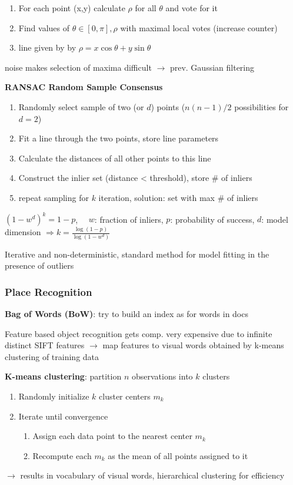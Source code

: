 \documentclass[fontsize=6pt]{scrartcl}
\begin{document}
\begin{multicols*}{4}
\begin{enumerate}
	\item For each point (x,y) calculate $\rho$ for all $\theta$  and vote for it 
	\item Find values of $\theta \in [0,\pi], \rho$ with maximal local votes (increase counter)
	\item line given by by $ \rho = x\cos \theta + y \sin \theta $ 
\end{enumerate}

noise makes selection of maxima difficult $\rightarrow$ prev. Gaussian filtering


\textbf{RANSAC Random Sample Consensus}

\begin{enumerate}
	\item Randomly select sample of two (or $d$) points ($n(n-1)/2$ possibilities for $d=2$)
	\item Fit a line through the two points, store line parameters
	\item Calculate the distances of all other points to this line
	\item Construct the inlier set (distance < threshold), store \# of inliers
	\item repeat sampling for $k$ iteration, solution: set with max \# of inliers  
\end{enumerate}
$( 1 - w^d)^k= 1-p$, $\quad w$: fraction of inliers, $p$: probability of success, $d$: model dimension
$\Rightarrow k = \frac{\log(1-p)}{\log(1-w^d)}$

Iterative and non-deterministic, standard method for model fitting in the presence of outliers


\subsubsection*{Place Recognition}

\textbf{Bag of Words (BoW)}: try to build an index as for words in docs

Feature based object recognition gets comp. very expensive due to infinite distinct SIFT features $\rightarrow$ map features to visual words obtained by k-means clustering of training data

\textbf{K-means clustering}: partition $n$ observations into $k$ clusters 
\begin{enumerate}
	\item Randomly initialize $k$ cluster centers $m_k$
	\item Iterate until convergence
	\begin{enumerate}
		\item Assign each data point to the nearest center $m_k$
		\item Recompute each $m_k$ as the mean of all points assigned to it
	\end{enumerate}
\end{enumerate}
$\rightarrow$ results in vocabulary of visual words, hierarchical clustering for efficiency


\end{multicols*}
\end{document}
